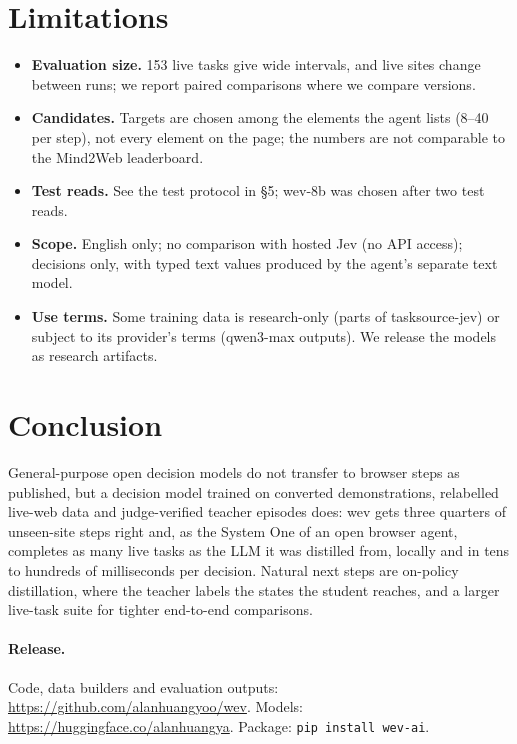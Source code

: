 \documentclass[11pt]{article}
\begin{document}
\section{Limitations}

\begin{itemize}
\item \textbf{Evaluation size.} 153 live tasks give wide intervals, and live sites change between runs; we report
paired comparisons where we compare versions.
\item \textbf{Candidates.} Targets are chosen among the elements the agent lists (8--40 per step), not every element
on the page; the numbers are not comparable to the Mind2Web leaderboard.
\item \textbf{Test reads.} See the test protocol in \S5; wev-8b was chosen after two test reads.
\item \textbf{Scope.} English only; no comparison with hosted Jev (no API access); decisions only, with typed text
values produced by the agent's separate text model.
\item \textbf{Use terms.} Some training data is research-only (parts of tasksource-jev) or subject to its provider's
terms (qwen3-max outputs). We release the models as research artifacts.
\end{itemize}

\section{Conclusion}

General-purpose open decision models do not transfer to browser steps as published, but a decision model trained on
converted demonstrations, relabelled live-web data and judge-verified teacher episodes does: wev gets three quarters
of unseen-site steps right and, as the System One of an open browser agent, completes as many live tasks as the LLM it
was distilled from, locally and in tens to hundreds of milliseconds per decision. Natural next steps are on-policy
distillation, where the teacher labels the states the student reaches, and a larger live-task suite for tighter
end-to-end comparisons.

\paragraph{Release.} Code, data builders and evaluation outputs: \url{https://github.com/alanhuangyoo/wev}. Models:
\url{https://huggingface.co/alanhuangya}. Package: \texttt{pip install wev-ai}.



\end{document}
